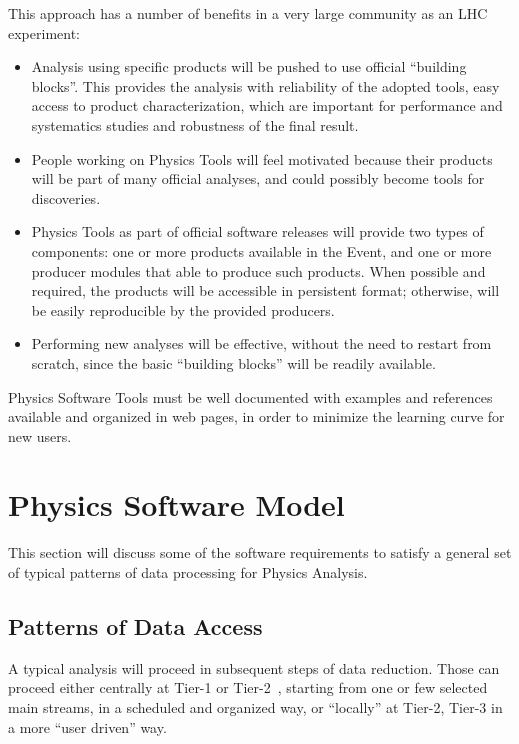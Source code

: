 \documentclass[draftmode]{memarticle}
\begin{document}
This approach has a number of benefits in a very large community as
an LHC experiment:
\begin{itemize}
\item{} Analysis using specific products will be pushed to use
official ``building blocks''. This provides the analysis with  
reliability of the adopted tools, easy access to product
characterization, which are important for performance and systematics studies and robustness of the final result.
\item{} People working on Physics Tools will feel motivated
because their products will be part of many official analyses, and could possibly become tools for discoveries.
\item{} Physics Tools as part of official software 
releases will provide two types of components:
one or more products available in the Event, and
one or more producer modules that able to produce such products.
When possible and required, the products will be accessible 
in persistent format; otherwise, will be
easily reproducible by the provided producers.

\item{} Performing new analyses will be effective, without the need
to restart from scratch, since the basic ``building blocks'' will
be readily available. 
\end{itemize}

Physics Software Tools must be well documented with examples and
references available and organized in web pages, in order to minimize
the learning curve for new users.

\chapter{Physics Software Model}

This section will discuss some of the software requirements to
satisfy a general set of typical patterns of data
processing for Physics Analysis.

\section{Patterns of Data Access}

A typical analysis will proceed in subsequent steps of
data reduction. Those can proceed either centrally
at Tier-1 or Tier-2~\cite{CMSCM}, starting from one or few selected
main streams, in a scheduled and organized way, 
or ``locally'' at Tier-2, Tier-3 in a more ``user driven'' way.
\end{document}

